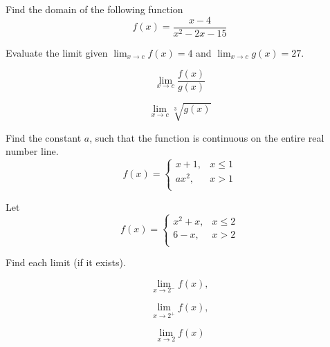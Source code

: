 \documentclass[11pt]{exam}
\begin{document}
\begin{questions}

\addpoints
\question[4] Find the domain of the following function
\[
f(x)=\frac{x-4}{x^{2}-2x-15}
\]
\vfill



\addpoints
\question[6] 
Evaluate the limit given $\lim_{x\to c} f(x)=4$ and $\lim_{x\to c} g(x)=27$. 
\\
\begin{minipage}{.5\linewidth}
\begin{equation*}
 \lim_{x\to c} \frac{f(x)}{g(x)}
\end{equation*}
\end{minipage}%
\begin{minipage}{.5\linewidth}
\begin{equation*}
 \lim_{x\to c} \sqrt[3]{g(x)}
\end{equation*}
\end{minipage}
\vfill




\question[10] Find the constant $a$, such that the function is continuous on the entire real number line. 
\[   f(x)=\left\{
\begin{array}{ll}
      x+1,  & x\leq 1 \\
      ax^{2},  & x>1   \\ 
\end{array} 
\right. \]
\vfill



\newpage

\addpoints
\question[6] 
Let 
\[   f(x)=\left\{
\begin{array}{ll}
      x^{2}+x, & x\leq 2 \\
      6-x,     & x > 2\\
\end{array} 
\right. \]


Find each limit (if it exists).

\begin{minipage}{.3\linewidth}
\begin{equation*}
 \lim_{x\to 2^{-}}f(x),
\end{equation*}
\end{minipage}%
\begin{minipage}{.3\linewidth}
\begin{equation*}
 \lim_{x\to 2^{+}}f(x),
\end{equation*}
\end{minipage}%
\begin{minipage}{.3\linewidth}
\begin{equation*}
 \lim_{x\to 2}f(x)
\end{equation*}
\end{minipage}


\end{questions}
\end{document}
